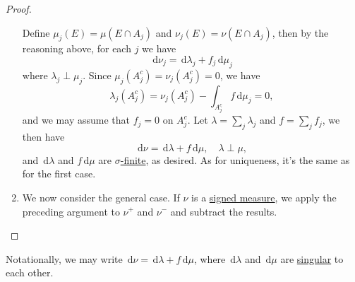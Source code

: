 \begin{proof}
\begin{enumerate}[(1)]
		      Define \(\mu _{j} (E) = \mu (E \cap A_{j} )\) and \(\nu _{j} (E)= \nu (E \cap A_{j} )\), then by the reasoning above, for each \(j\) we have
		      \[
			      \,\mathrm{d} \nu _{j} = \,\mathrm{d} \lambda _{j} + f_{j} \,\mathrm{d} \mu _{j}
		      \]
		      where \(\lambda _{j} \perp \mu _{j} \). Since \(\mu _{j} (A^{c} _{j} ) = \nu _{j} (A^{c} _{j} ) = 0\), we have
		      \[
			      \lambda _{j} (A^{c} _{j} ) = \nu _{j} (A^{c} _{j} )- \int _{A^{c} _{j} }f \,\mathrm{d} \mu _{j} = 0,
		      \]
		      and we may assume that \(f_{j} = 0\) on \(A^{c} _{j} \). Let \(\lambda = \sum_j \lambda _{j} \) and \(f = \sum_{j}f_{j}  \), we then have
		      \[
			      \,\mathrm{d} \nu = \,\mathrm{d} \lambda + f \,\mathrm{d} \mu , \quad \lambda \perp \mu ,
		      \]
		      and \(\,\mathrm{d} \lambda \) and \(f \,\mathrm{d} \mu \) are \hyperref[def:finite-signed-measure]{\(\sigma \)-finite}, as desired. As for uniqueness, it's the same
		      as for the first case.
		\item We now consider the general case. If \(\nu\) is a \hyperref[def:signed-measure]{signed measure}, we apply the preceding argument to \(\nu ^+\) and
		      \(\nu ^-\) and subtract the results.
	\end{enumerate}
\end{proof}
\begin{remark}
	Notationally, we may write \(\,\mathrm{d} \nu = \,\mathrm{d} \lambda + f \,\mathrm{d} \mu\), where \(\,\mathrm{d} \lambda\)
	and \(\,\mathrm{d} \mu\) are \hyperref[def:singular]{singular} to each other.
\end{remark}